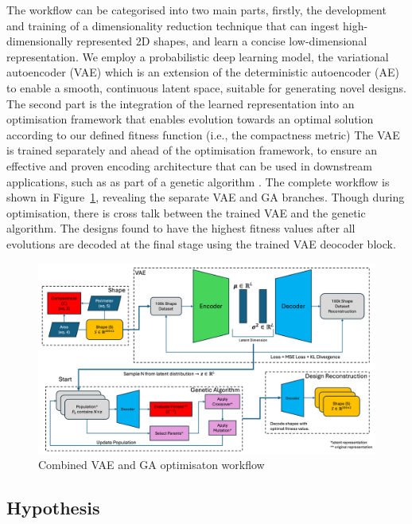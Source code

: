 \documentclass{article}
\begin{document}
The workflow can be categorised into two main parts, firstly, the development and training of a dimensionality reduction technique that can ingest high-dimensionally represented 2D shapes, and learn a concise low-dimensional representation. We employ a probabilistic deep learning model, the variational autoencoder (VAE) which is an extension of the deterministic autoencoder (AE) to enable a smooth, continuous latent space, suitable for generating novel designs. The second part is the integration of the learned representation into an optimisation framework that enables evolution towards an optimal solution according to our defined fitness function (i.e., the compactness metric) The VAE is trained separately and ahead of the optimisation framework, to ensure an effective and proven encoding architecture that can be used in downstream applications, such as as part of a genetic algorithm \citep{Deshpande2024}. The complete workflow is shown in Figure~\ref{VAE_GA_workflow}, revealing the separate VAE and GA branches. Though during optimisation, there is cross talk between the trained VAE and the genetic algorithm. The designs found to have the highest fitness values after all evolutions are decoded at the final stage using the trained VAE deocoder block.


\begin{figure}[htp]
    \centering
    \includegraphics[width=12cm]{figures/workflow_diagram.png}
    \caption{Combined VAE and GA optimisaton workflow}

    \label{VAE_GA_workflow}
\end{figure}

\subsection{Hypothesis}
\end{document}
